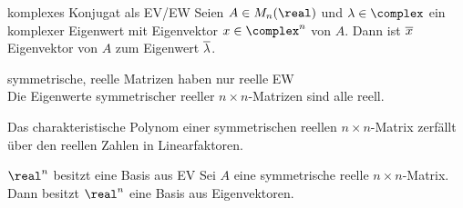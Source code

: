 \begin{Satz}{komplexes Konjugat als EV/EW}
    Seien $A \in M_n(\real)$ und $\lambda \in \complex$ ein komplexer Eigenwert
    mit Eigenvektor $x \in \complex^n$ von $A$.
    Dann ist $\overline{x}$ Eigenvektor von $A$ zum Eigenwert $\overline{\lambda}$.
\end{Satz}

\begin{Satz}{symmetrische, reelle Matrizen haben nur reelle EW} \\
    Die Eigenwerte symmetrischer reeller $n \times n$-Matrizen sind alle reell.
\end{Satz}

\begin{Kor}
    Das charakteristische Polynom einer symmetrischen reellen
    $n \times n$-Matrix zerfällt über den reellen Zahlen in Linearfaktoren.
\end{Kor}

\begin{Satz}{$\real^n$ besitzt eine Basis aus EV}
    Sei $A$ eine symmetrische reelle $n \times n$-Matrix. \\
    Dann besitzt $\real^n$ eine Basis aus Eigenvektoren.
\end{Satz}

\pagebreak

